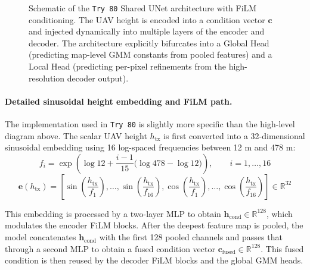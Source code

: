 \documentclass[11pt,a4paper]{article}
\begin{document}
\begin{figure}[H]
{
}
\caption{Schematic of the \texttt{Try 80} Shared UNet architecture with FiLM conditioning. 
The UAV height is encoded into a condition vector $\mathbf{c}$ and injected dynamically into 
multiple layers of the encoder and decoder. The architecture explicitly bifurcates into a 
Global Head (predicting map-level GMM constants from pooled features) and a Local Head 
(predicting per-pixel refinements from the high-resolution decoder output).}
\label{fig:try80_arch}
\end{figure}

\paragraph{Detailed sinusoidal height embedding and FiLM path.}
The implementation used in \texttt{Try 80} is slightly more specific than the
high-level diagram above. The scalar UAV height $h_{\mathrm{tx}}$ is first
converted into a 32-dimensional sinusoidal embedding using 16 log-spaced
frequencies between 12 m and 478 m:
\begin{equation}
f_i
=
\exp\!\left(
\log 12
+
\frac{i-1}{15}\bigl(\log 478 - \log 12\bigr)
\right),
\qquad i=1,\dots,16
\end{equation}
\begin{equation}
\mathbf{e}(h_{\mathrm{tx}})
=
\left[
\sin\!\left(\frac{h_{\mathrm{tx}}}{f_1}\right), \dots,
\sin\!\left(\frac{h_{\mathrm{tx}}}{f_{16}}\right),
\cos\!\left(\frac{h_{\mathrm{tx}}}{f_1}\right), \dots,
\cos\!\left(\frac{h_{\mathrm{tx}}}{f_{16}}\right)
\right]
\in \mathbb{R}^{32}
\label{eq:try80_height_embed}
\end{equation}

This embedding is processed by a two-layer MLP to obtain
$\mathbf{h}_{\mathrm{cond}} \in \mathbb{R}^{128}$, which modulates the encoder
FiLM blocks. After the deepest feature map is pooled, the model concatenates
$\mathbf{h}_{\mathrm{cond}}$ with the first 128 pooled channels and passes that
through a second MLP to obtain a fused condition vector
$\mathbf{c}_{\mathrm{fused}} \in \mathbb{R}^{128}$. This fused condition is
then reused by the decoder FiLM blocks and the global GMM heads.
\end{document}
